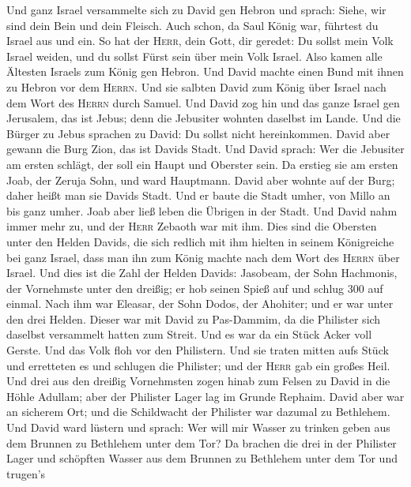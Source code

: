  Und ganz Israel versammelte sich zu David gen Hebron und
sprach: Siehe, wir sind dein Bein und dein Fleisch.  Auch
schon, da Saul König war, führtest du Israel aus und ein. So hat der
\textsc{Herr}, dein Gott, dir geredet: Du sollst mein Volk Israel
weiden, und du sollst Fürst sein über mein Volk Israel. 
Also kamen alle Ältesten Israels zum König gen Hebron. Und David machte
einen Bund mit ihnen zu Hebron vor dem \textsc{Herrn}. Und sie salbten
David zum König über Israel nach dem Wort des \textsc{Herrn} durch
Samuel.  Und David zog hin und das ganze Israel gen
Jerusalem, das ist Jebus; denn die Jebusiter wohnten daselbst im Lande.
 Und die Bürger zu Jebus sprachen zu David: Du sollst
nicht hereinkommen. David aber gewann die Burg Zion, das ist Davids
Stadt.  Und David sprach: Wer die Jebusiter am ersten
schlägt, der soll ein Haupt und Oberster sein. Da erstieg sie am ersten
Joab, der Zeruja Sohn, und ward Hauptmann.  David aber
wohnte auf der Burg; daher heißt man sie Davids Stadt. 
Und er baute die Stadt umher, von Millo an bis ganz umher. Joab aber
ließ leben die Übrigen in der Stadt.  Und David nahm immer
mehr zu, und der \textsc{Herr} Zebaoth war mit ihm.  Dies
sind die Obersten unter den Helden Davids, die sich redlich mit ihm
hielten in seinem Königreiche bei ganz Israel, dass man ihn zum König
machte nach dem Wort des \textsc{Herrn} über Israel.  Und
dies ist die Zahl der Helden Davids: Jasobeam, der Sohn Hachmonis, der
Vornehmste unter den dreißig; er hob seinen Spieß auf und schlug 300 auf
einmal.  Nach ihm war Eleasar, der Sohn Dodos, der
Ahohiter; und er war unter den drei Helden.  Dieser war
mit David zu Pas-Dammim, da die Philister sich daselbst versammelt
hatten zum Streit. Und es war da ein Stück Acker voll Gerste. Und das
Volk floh vor den Philistern.  Und sie traten mitten aufs
Stück und erretteten es und schlugen die Philister; und der
\textsc{Herr} gab ein großes Heil.  Und drei aus den
dreißig Vornehmsten zogen hinab zum Felsen zu David in die Höhle
Adullam; aber der Philister Lager lag im Grunde Rephaim. 
David aber war an sicherem Ort; und die Schildwacht der Philister war
dazumal zu Bethlehem.  Und David ward lüstern und sprach:
Wer will mir Wasser zu trinken geben aus dem Brunnen zu Bethlehem unter
dem Tor?  Da brachen die drei in der Philister Lager und
schöpften Wasser aus dem Brunnen zu Bethlehem unter dem Tor und trugen's
